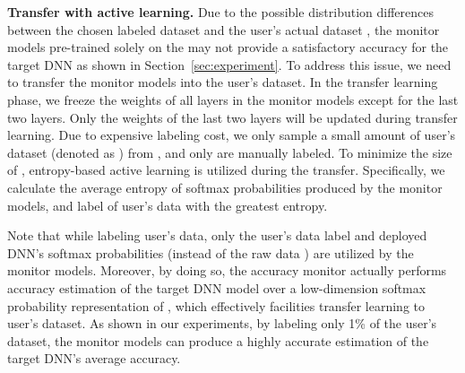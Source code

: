 \documentclass{article}
\begin{document}
\textbf{Transfer with active learning. } Due to the possible distribution differences between the chosen labeled dataset  and the user's actual dataset , the
monitor models pre-trained solely on the  may not provide a satisfactory accuracy for the target
DNN as shown in Section~\ref{sec:experiment}.
To address this issue,
we need to transfer the monitor models into  the user's dataset.
In the transfer learning phase, we freeze the weights of all layers in the monitor models except for the last two layers. Only the weights of the last two layers will be updated during transfer learning. Due to expensive labeling cost, we only sample a small amount
of user's dataset (denoted as ) from
 , and only  are manually labeled. To minimize the size of , entropy-based active learning \cite{ensemble_active_learning_2018} is utilized during the transfer. {Specifically, we calculate the average entropy of softmax probabilities produced by the monitor models, and
 label  of user's data with the greatest entropy.}

 Note that while labeling user's data, only the user's data label  and deployed DNN's softmax probabilities 
 (instead of the raw data ) are utilized
 by the monitor models.
 Moreover, by doing so, the accuracy monitor actually performs accuracy estimation
 of the target DNN model
 over a low-dimension softmax probability representation of ,
 which effectively facilities transfer learning to user's dataset. As shown in
 our experiments,
 by labeling only 1\% of the user's dataset, the monitor models can produce a highly accurate estimation of the target DNN's average accuracy.
\end{document}

